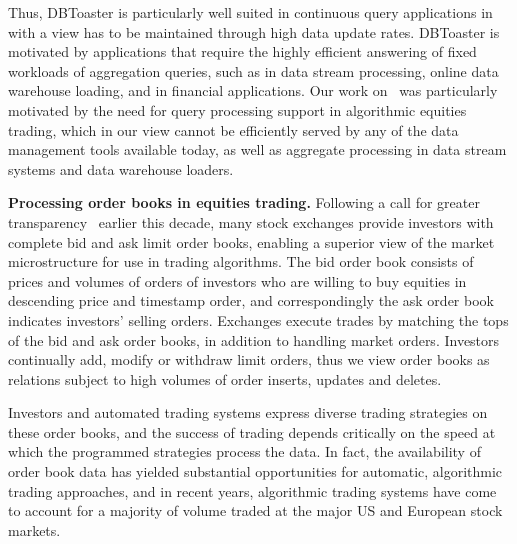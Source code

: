 Thus, DBToaster is particularly well suited in continuous query applications
in with a view has to be maintained through high data update rates.
DBToaster is  motivated  by  applications  that  require  the  highly
efficient answering of fixed workloads of aggregation queries, such as
in  data stream  processing,  online data  warehouse  loading, and  in
financial applications.
Our work on \compiler\ was particularly motivated by the need for query
processing support in algorithmic equities trading, which in
our view cannot be efficiently served by any of the data management tools
available today, as well as aggregate processing in data stream systems and
data warehouse loaders.


\medskip


\textbf{Processing order books in equities trading.}
Following a call for greater transparency~\cite{sec-orderbook:00} earlier this
decade, many stock exchanges provide investors with complete bid and ask limit
order books, enabling a superior view of the market microstructure for use in
trading algorithms. The bid order book consists of prices and volumes of
orders of investors who
are willing to buy equities in descending price and timestamp order, and
correspondingly the ask order book indicates investors' selling orders.
Exchanges execute trades by matching the tops of the bid and ask order books,
in addition to
handling market orders. Investors continually add, modify or withdraw limit
orders, thus we view order books as relations subject to high volumes of order
inserts, updates and deletes.

Investors and automated trading systems express diverse trading strategies on
these order books, and the success of trading depends critically on the
speed at
which the programmed strategies process the data.
In fact, the availability of order book data has yielded substantial opportunities for automatic, algorithmic trading approaches, and in recent years,
algorithmic trading systems have come to account for a majority of 
volume traded at the major US and European stock markets.

